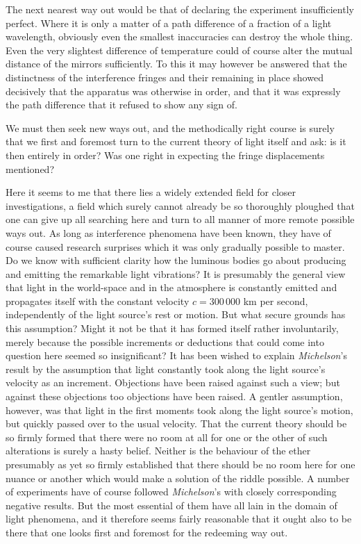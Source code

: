 \documentclass[12pt,a4paper]{article}
\begin{document}
The next nearest way out would be that of declaring the experiment
insufficiently perfect. Where it is only a matter of a path difference of a
fraction of a light wavelength, obviously even the smallest inaccuracies can
destroy the whole thing. Even the very slightest difference of temperature
could of course alter the mutual distance of the mirrors sufficiently. To this
it may however be answered that the distinctness of the interference fringes
and their remaining in place showed decisively
that the apparatus was otherwise in order, and that it was expressly the path
difference that it refused to show any sign of.

We must then seek new ways out, and the methodically right course is surely
that we first and foremost turn to the current theory of light itself and ask:
is it then entirely in order? Was one right in expecting the fringe
displacements mentioned?

Here it seems to me that there lies a widely extended field for closer
investigations, a field which surely cannot already be so thoroughly ploughed
that one can give up all searching here and turn to all manner of more remote
possible ways out. As long as interference phenomena have been known, they
have of course caused research surprises which it was only gradually possible
to master. Do we know with sufficient clarity how the luminous bodies go about
producing and emitting the remarkable light vibrations? It is presumably the
general view that light in the world-space and in the atmosphere is constantly
emitted and propagates itself with the constant velocity
$c = 300\,000$ km per second, independently of the light source's rest or
motion. But what secure grounds has this assumption? Might it not be that it
has formed itself rather involuntarily, merely because the possible increments
or deductions that could come into question here seemed so insignificant? It
has been wished to explain \emph{Michelson}'s result by the assumption that
light constantly took along the light source's velocity as an increment.
Objections have been raised against such a view; but against these objections
too objections have been raised. A gentler assumption, however, was that light
in the first moments took along the light source's motion, but quickly passed
over to the usual velocity. That the current theory should be so firmly formed
that there were no room at all for one or the other of such alterations is
surely a hasty belief. Neither is the behaviour of the ether presumably as yet
so firmly established that there should be no room here for one nuance or
another which would make a solution of the riddle possible. A number of
experiments have of course followed \emph{Michelson}'s with closely
corresponding negative results. But the most essential of them have all lain
in the domain of light phenomena, and it therefore seems fairly reasonable
that it ought also to be there that one looks first and foremost for the
redeeming way out.
\end{document}
